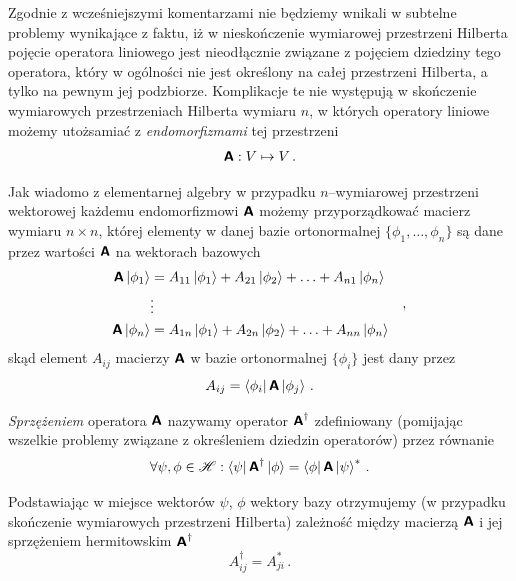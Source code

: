 \documentclass{myclass}
\begin{document}
Zgodnie z wcześniejszymi komentarzami nie będziemy wnikali w subtelne problemy wynikające z faktu,
iż w nieskończenie wymiarowej przestrzeni Hilberta pojęcie operatora liniowego jest nieodłącznie
związane z pojęciem dziedziny tego operatora, który w ogólności nie jest określony na całej
przestrzeni Hilberta, a tylko na pewnym jej podzbiorze. Komplikacje te nie występują w skończenie
wymiarowych przestrzeniach Hilberta wymiaru \(n\), w których operatory liniowe możemy utożsamiać z
\textit{endomorfizmami} tej przestrzeni
\begin{equation*}
\boldsymbol{\mathsf{A}}: V \mapsto V\,.
\end{equation*}

Jak wiadomo z elementarnej algebry w przypadku \(n\)--wymiarowej przestrzeni wektorowej każdemu
endomorfizmowi \(\boldsymbol{\mathsf{A}}\) możemy przyporządkować macierz wymiaru \(n\times n\), której elementy w
danej bazie ortonormalnej \(\{\phi_1,\ldots,\phi_n\}\) są dane przez wartości \(\boldsymbol{\mathsf{A}}\) na
wektorach bazowych
\begin{equation*}
\begin{split}
\boldsymbol{\mathsf{A}}\ket{\phi_1} &= A_{11}\ket{\phi_1} + A_{21}\ket{\phi_2} + \ldots + A_{n1}\ket{\phi_n}\\
&\vdots\\
\boldsymbol{\mathsf{A}}\ket{\phi_n} &= A_{1n}\ket{\phi_1} + A_{2n}\ket{\phi_2} + \ldots + A_{nn}\ket{\phi_n}
\end{split}\quad,
\end{equation*}
skąd element \(A_{ij}\) macierzy \(\boldsymbol{\mathsf{A}}\) w bazie ortonormalnej \(\{\phi_i\}\) jest dany przez
\begin{equation*}
A_{ij} = \bra{\phi_i}\boldsymbol{\mathsf{A}}\ket{\phi_j}\,.
\end{equation*}

\begin{definition}
\textit{Sprzężeniem} operatora \(\boldsymbol{\mathsf{A}}\) nazywamy operator \(\boldsymbol{\mathsf{A}}^\dagger\) zdefiniowany
(pomijając wszelkie problemy związane z określeniem dziedzin operatorów) przez równanie
\begin{equation*}
\forall \psi,\phi\in\mathscr{H}: \bra{\psi}\boldsymbol{\mathsf{A}}^\dagger\ket{\phi} = \bra{\phi}\boldsymbol{\mathsf{A}}\ket{\psi}^*\,.
\end{equation*}
\end{definition}

Podstawiając w miejsce wektorów \(\psi\), \(\phi\) wektory bazy otrzymujemy (w przypadku skończenie
wymiarowych przestrzeni Hilberta) zależność między macierzą \(\boldsymbol{\mathsf{A}}\) i jej sprzężeniem
hermitowskim \(\boldsymbol{\mathsf{A}}^\dagger\)
\begin{equation*}
A^\dagger_{ij} = A_{ji}^*\,.
\end{equation*} 
\end{document}
